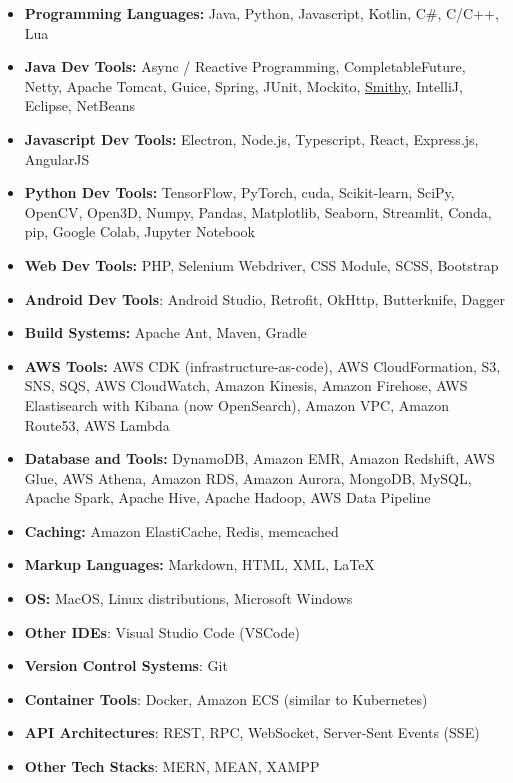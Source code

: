 \newcommand{\Smithy}{\href{https://smithy.io/}{Smithy}}
\begin{itemize}[label={}, leftmargin=0in]
   \setlength\itemsep{0em}
   \item \textbf{Programming Languages:} Java, Python, Javascript, Kotlin, C\#, C/C++, Lua
   \item \textbf{Java Dev Tools:} Async / Reactive Programming, CompletableFuture, Netty, Apache Tomcat, Guice, Spring, JUnit, Mockito, \Smithy, IntelliJ, Eclipse, NetBeans
   \item \textbf{Javascript Dev Tools:} Electron, Node.js, Typescript, React, Express.js, AngularJS
   \item \textbf{Python Dev Tools:} TensorFlow, PyTorch, cuda, Scikit-learn, SciPy, OpenCV, Open3D, Numpy, Pandas, Matplotlib, Seaborn, Streamlit, Conda, pip, Google Colab, Jupyter Notebook
   \item \textbf{Web Dev Tools:} PHP, Selenium Webdriver, CSS Module, SCSS, Bootstrap
   \item \textbf{Android Dev Tools}: Android Studio, Retrofit, OkHttp, Butterknife, Dagger
   \item \textbf{Build Systems:} Apache Ant, Maven, Gradle
   \item \textbf{AWS Tools:} AWS CDK (infrastructure-as-code), AWS CloudFormation, S3, SNS, SQS, AWS CloudWatch, Amazon Kinesis, Amazon Firehose, AWS Elastisearch with Kibana (now OpenSearch), Amazon VPC, Amazon Route53, AWS Lambda
   \item \textbf{Database and Tools:} DynamoDB, Amazon EMR, Amazon Redshift, AWS Glue, AWS Athena, Amazon RDS, Amazon Aurora, MongoDB, MySQL, Apache Spark, Apache Hive, Apache Hadoop, AWS Data Pipeline
   \item \textbf{Caching:} Amazon ElastiCache, Redis, memcached
   \item \textbf{Markup Languages:} Markdown, HTML, XML, \LaTeX
   \item \textbf{OS:} MacOS, Linux distributions, Microsoft Windows
   \item \textbf{Other IDEs}: Visual Studio Code (VSCode)
   \item \textbf{Version Control Systems}: Git
   \item \textbf{Container Tools}: Docker, Amazon ECS (similar to Kubernetes)
   \item \textbf{API Architectures}: REST, RPC, WebSocket, Server-Sent Events (SSE)
   \item \textbf{Other Tech Stacks}: MERN, MEAN, XAMPP
\end{itemize}

